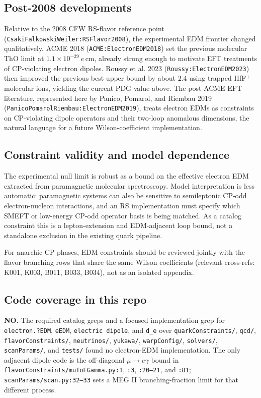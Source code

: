 \subsection*{Post-2008 developments}
Relative to the 2008 CFW RS-flavor reference point
(\texttt{CsakiFalkowskiWeiler:RSFlavor2008}), the experimental EDM frontier
changed qualitatively.  ACME 2018 (\texttt{ACME:ElectronEDM2018}) set the
previous molecular ThO
limit at \(1.1\times10^{-29}\ e\,\mathrm{cm}\), already strong enough to
motivate EFT treatments of CP-violating electron dipoles.  Roussy et al. 2023
(\texttt{Roussy:ElectronEDM2023}) then improved the previous best upper
bound by about \(2.4\) using trapped HfF\({}^+\) molecular ions, yielding the
current PDG value above.  The post-ACME EFT literature, represented here by
Panico, Pomarol, and Riembau 2019
(\texttt{PanicoPomarolRiembau:ElectronEDM2019}), treats electron EDMs as
constraints on CP-violating dipole operators and their two-loop anomalous
dimensions, the natural language for a future Wilson-coefficient
implementation.

\subsection*{Constraint validity and model dependence}
The experimental null limit is robust as a bound on the effective electron EDM
extracted from paramagnetic molecular spectroscopy.  Model interpretation is
less automatic: paramagnetic systems can also be sensitive to semileptonic
CP-odd electron-nucleon interactions, and an RS implementation must specify
which SMEFT or low-energy CP-odd operator basis is being matched.  As a
catalog constraint this is a lepton-extension and EDM-adjacent loop bound, not
a standalone exclusion in the existing quark pipeline.

For anarchic CP phases, EDM constraints should be reviewed jointly with the
flavor branching rows that share the same Wilson coefficients (relevant
cross-refs: K001, K003, B011, B033, B034), not as an isolated appendix.

\subsection*{Code coverage in this repo}
\textbf{NO.}  The required catalog greps and a focused implementation grep for
\texttt{electron.?EDM}, \texttt{eEDM}, \texttt{electric dipole}, and
\texttt{d\_e} over \texttt{quarkConstraints/}, \texttt{qcd/},
\texttt{flavorConstraints/}, \texttt{neutrinos/}, \texttt{yukawa/},
\texttt{warpConfig/}, \texttt{solvers/}, \texttt{scanParams/}, and
\texttt{tests/} found no electron-EDM implementation.  The only adjacent
dipole code is the off-diagonal \(\mu\to e\gamma\) bound in
\texttt{flavorConstraints/muToEGamma.py:1}, \texttt{:3},
\texttt{:20--21}, and \texttt{:81}; \texttt{scanParams/scan.py:32--33}
sets a MEG II branching-fraction limit for that different process.

